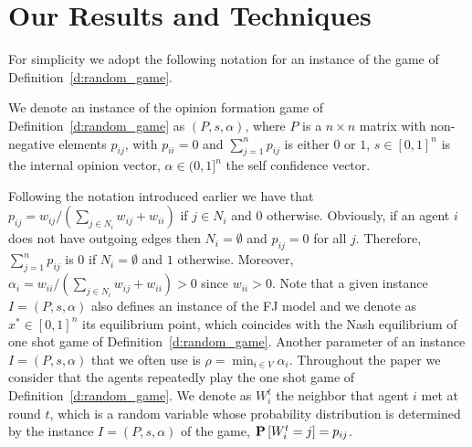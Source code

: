 \section{Our Results and Techniques}

For simplicity we adopt the following notation for
an instance of the game of Definition~\ref{d:random_game}.
%
\begin{definition}\label{d:instance}
  We denote an instance of the opinion formation game of Definition~\ref{d:random_game}
  as $(P,s,\alpha)$, where
    $P$ is a $n \times n$  matrix with non-negative elements $p_{ij}$,
      with $p_{ii}=0$ and $\sum_{j=1}^n p_{ij}$ is either $0$ or $1$,
    $s \in [0,1]^n$ is the internal opinion vector,
    $\alpha \in (0,1]^n$ the self confidence vector.
\end{definition}
%
Following the notation introduced earlier we have that
$p_{ij} = w_{ij}/(\sum_{j \in N_i}w_{ij}+w_{ii})$ if $j \in N_i$ and $0$ otherwise.
Obviously, if an agent $i$ does not have outgoing edges then $N_i = \emptyset$ and
$p_{ij} = 0$ for all $j$. Therefore, $\sum_{j=1}^n p_{ij}$ is $0$ if $N_i= \emptyset$
and $1$ otherwise.
Moreover, $\alpha_i=w_{ii}/(\sum_{j \in N_i}w_{ij}+w_{ii})>0$ since $w_{ii}>0$.
Note that a given instance $I=(P,s,\alpha)$ also defines an instance
of the FJ model and we denote as $x^* \in [0,1]^n$
its equilibrium point, which coincides with the Nash equilibrium
of one shot game of Definition~\ref{d:random_game}.
Another parameter of an instance $I=(P,s,\alpha)$ that we often use is
$\rho=\min_{i \in V}\alpha_i$. Throughout the paper we consider that
the agents repeatedly play the one shot game of Definition~\ref{d:random_game}.
We denote as $W_i^t$ the neighbor that agent $i$ met
at round $t$, which is a random variable whose
probability distribution is determined by the
instance $I=(P,s,\alpha)$ of the game, $\bm{\mathrm{P}}\left[W_i^t=j\right]=p_{ij}$.



